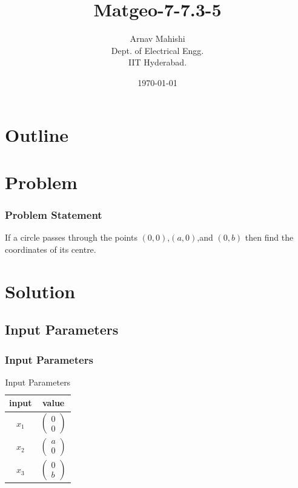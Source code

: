 \documentclass{beamer}
\title{Matgeo-7-7.3-5}
\author{Arnav Mahishi \\ Dept. of Electrical Engg.\\IIT Hyderabad.}
\date{\today}
\providecommand{\brak}[1]{\ensuremath{\left(#1\right)}}
\theoremstyle{remark}
\newcommand{\myvec}[1]{\ensuremath{\begin{pmatrix}#1\end{pmatrix}}}
\numberwithin{equation}{section}
\begin{document}
\begin{frame}
\titlepage
\end{frame}
\section*{Outline}
\begin{frame}
\tableofcontents
\end{frame}
\section{Problem}
\begin{frame}
\frametitle{Problem Statement}
If a circle passes through the points $\brak{0,0}$,$\brak{a,0}$,and $\brak{0,b}$ then find the coordinates of its centre.
\end{frame}

\section{Solution}
\subsection{Input Parameters}
\begin{frame}
\frametitle{Input Parameters}
\begin{table}[]
    \centering
    \begin{tabular}[10pt]{|c|c|}
    \hline
    \textbf{input} & \textbf{value}\\ 
    \hline
    $x_1$&$\myvec{0\\0}$\\
    \hline 
    $x_2$&$\myvec{a\\0}$\\
    \hline 
    $x_3$&$\myvec{0\\b}$\\
    \hline
    \end{tabular}
    \caption{Input Parameters}
    \label{tab:my_label}
\end{table}
\end{frame}
\end{document}
